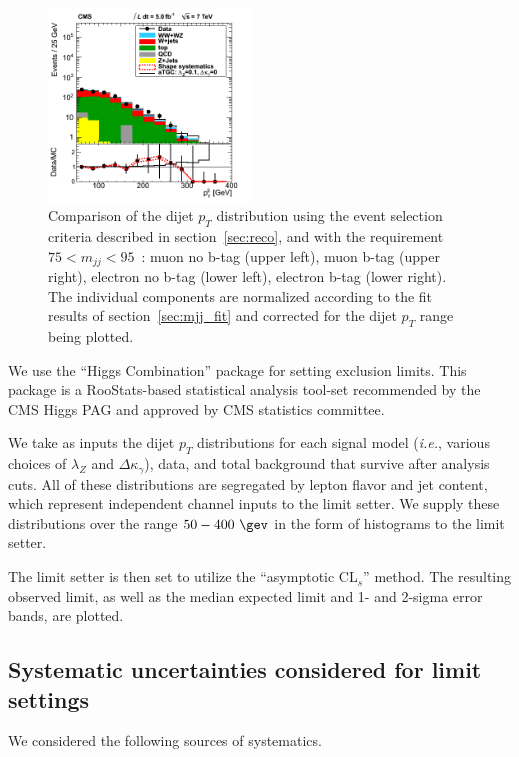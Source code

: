 \begin{figure}[h!t]
{    \includegraphics[width=0.48\textwidth]{figs/el_btag_dijetPt.png}
    \caption{Comparison of the dijet $p_T$ distribution using the event 
    selection criteria described in section~\ref{sec:reco}, and with the requirement
    $75 < m_{jj} < 95$~\GeV : 
    muon no b-tag (upper left), muon b-tag (upper right), electron 
    no b-tag (lower left), electron b-tag (lower right).
    The individual components are normalized according to the fit 
    results of section~\ref{sec:mjj_fit} and corrected for the 
    dijet $p_T$ range being plotted.
    }
    \label{fig:ww_dijetPt_stacked}}
\end{figure}


We use the ``Higgs Combination'' package \cite{cite:combine} for
setting exclusion limits. This package is a
RooStats\cite{cite:roostats}-based statistical analysis tool-set
recommended by the CMS Higgs PAG and approved by CMS statistics committee.

We take as inputs the dijet $p_T$
distributions for each signal model (\textit{i.e.},  
various choices of $\lambda_Z$ and $\Delta{\kappa_\gamma}$), 
data, and total background that
survive after analysis cuts. 
All of these distributions are segregated by lepton flavor and jet content,
which represent independent
channel inputs to the limit setter. 
We supply
these distributions over the range $50-400~\gev$ in the form of
histograms to the limit setter.


The limit setter is then set to utilize the ``asymptotic CL$_{s}$''
\cite{cite:asympcls1,cite:asympcls2} method. The resulting observed limit, as well as
the median expected limit and 1- and 2-sigma error bands, are plotted.
\subsection{Systematic uncertainties considered for limit settings}
We considered the following sources of systematics.
